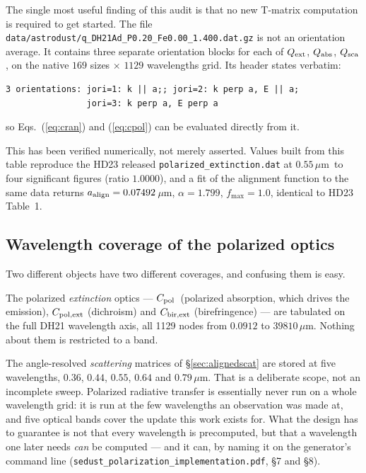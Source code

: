 \documentclass{my_memo}
\newcommand{\code}[1]{\texttt{#1}}
\newcommand{\um}{\ensuremath{\,\mu\mathrm{m}}}
\newcommand{\Cpol}{\ensuremath{C_{\rm pol}}}
\newcommand{\aalign}{\ensuremath{a_{\rm align}}}
\begin{document}
The single most useful finding of this audit is that no new T-matrix
computation is required to get started. The file
\code{data/astrodust/q\_DH21Ad\_P0.20\_Fe0.00\_1.400.dat.gz}
is not an orientation average. It contains three separate orientation
blocks for each of $Q_{\rm ext}$, $Q_{\rm abs}$, $Q_{\rm sca}$, on the
native $169$ sizes $\times$ $1129$ wavelengths grid. Its header states
verbatim:

\begin{lstlisting}[style=sh]
3 orientations: jori=1: k || a;; jori=2: k perp a, E || a;
                jori=3: k perp a, E perp a
\end{lstlisting}

so Eqs.~(\ref{eq:cran}) and (\ref{eq:cpol}) can be evaluated directly
from it.

This has been verified numerically, not merely asserted. Values built
from this table reproduce the HD23 released
\code{polarized\_extinction.dat} at $0.55$\um\ to four significant
figures (ratio $1.0000$), and a fit of the alignment function to the same
data returns $\aalign = 0.07492$\um, $\alpha = 1.799$, $f_{\max} = 1.0$,
identical to HD23 Table~1.

\subsection{Wavelength coverage of the polarized optics}
\label{sec:polcoverage}

Two different objects have two different coverages, and confusing them is
easy.

The polarized \emph{extinction} optics --- \Cpol\ (polarized absorption,
which drives the emission), $C_{\rm pol,ext}$ (dichroism) and
$C_{\rm bir,ext}$ (birefringence) --- are tabulated on the full DH21
wavelength axis, all 1129 nodes from $0.0912$ to $39810\um$. Nothing about
them is restricted to a band.

The angle-resolved \emph{scattering} matrices of
\S\ref{sec:alignedscat} are stored at five wavelengths, $0.36$, $0.44$,
$0.55$, $0.64$ and $0.79\um$. That is a deliberate scope, not an
incomplete sweep. Polarized radiative transfer is essentially never run
on a whole wavelength grid: it is run at the few wavelengths an
observation was made at, and five optical bands cover the update this
work exists for. What the design has to guarantee is not that every
wavelength is precomputed, but that a wavelength one later needs
\emph{can} be computed --- and it can, by naming it on the generator's
command line
(\code{sedust\_polarization\_implementation.pdf}, \S7 and \S8).
\end{document}
